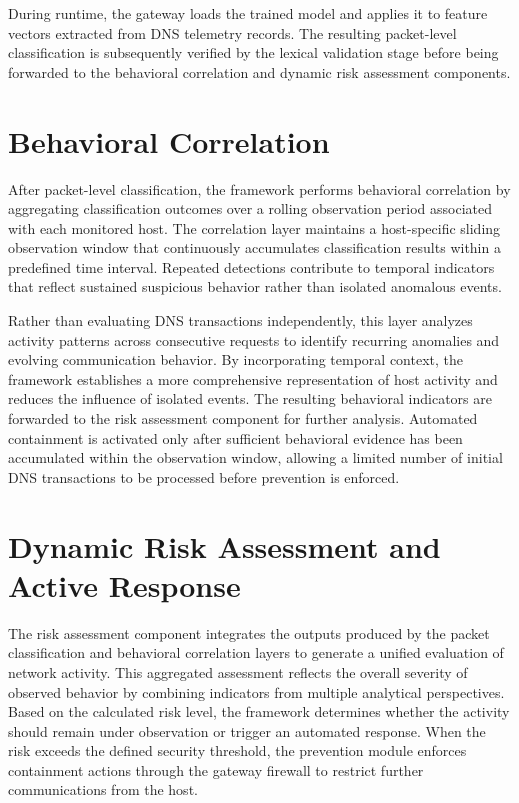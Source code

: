 \documentclass[14pt, a4paper, oneside]{report}
\begin{document}
During runtime, the gateway loads the trained model and applies it to feature vectors extracted from DNS telemetry records. The resulting packet-level classification is subsequently verified by the lexical validation stage before being forwarded to the behavioral correlation and dynamic risk assessment components.


\section{Behavioral Correlation}
\label{sec:sliding_window}

After packet-level classification, the framework performs behavioral correlation by aggregating classification outcomes over a rolling observation period associated with each monitored host. The correlation layer maintains a host-specific sliding observation window that continuously accumulates classification results within a predefined time interval. Repeated detections contribute to temporal indicators that reflect sustained suspicious behavior rather than isolated anomalous events.

Rather than evaluating DNS transactions independently, this layer analyzes activity patterns across consecutive requests to identify recurring anomalies and evolving communication behavior. By incorporating temporal context, the framework establishes a more comprehensive representation of host activity and reduces the influence of isolated events. The resulting behavioral indicators are forwarded to the risk assessment component for further analysis. Automated containment is activated only after sufficient behavioral evidence has been accumulated within the observation window, allowing a limited number of initial DNS transactions to be processed before prevention is enforced.

\section{Dynamic Risk Assessment and Active Response}
\label{sec:risk_scoring_prevention}

The risk assessment component integrates the outputs produced by the packet classification and behavioral correlation layers to generate a unified evaluation of network activity. This aggregated assessment reflects the overall severity of observed behavior by combining indicators from multiple analytical perspectives. Based on the calculated risk level, the framework determines whether the activity should remain under observation or trigger an automated response. When the risk exceeds the defined security threshold, the prevention module enforces containment actions through the gateway firewall to restrict further communications from the host.
\end{document}
